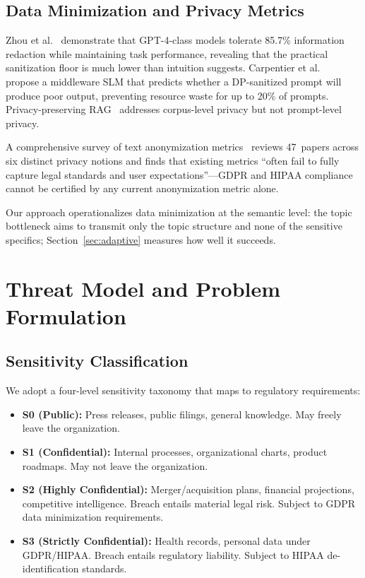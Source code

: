 \documentclass[sigconf,balance=false]{acmart}
\begin{document}
\subsection{Data Minimization and Privacy Metrics}
\label{sec:rw-minimization}

Zhou et al.~\cite{zhou2025} demonstrate that GPT-4-class models tolerate 85.7\% information redaction while maintaining task performance, revealing that the practical sanitization floor is much lower than intuition suggests.
Carpentier et al.~\cite{carpentier2024} propose a middleware SLM that predicts whether a DP-sanitized prompt will produce poor output, preventing resource waste for up to 20\% of prompts.
Privacy-preserving RAG~\cite{zeng2024, syntheticrag2024, dprag2024} addresses corpus-level privacy but not prompt-level privacy.

A comprehensive survey of text anonymization metrics~\cite{metricssurvey2025} reviews 47~papers across six distinct privacy notions and finds that existing metrics ``often fail to fully capture legal standards and user expectations''---GDPR and HIPAA compliance cannot be certified by any current anonymization metric alone.

Our approach operationalizes data minimization at the semantic level: the topic bottleneck aims to transmit only the topic structure and none of the sensitive specifics; Section~\ref{sec:adaptive} measures how well it succeeds.

\section{Threat Model and Problem Formulation}
\label{sec:threat}

\subsection{Sensitivity Classification}
\label{sec:sensitivity}

We adopt a four-level sensitivity taxonomy that maps to regulatory requirements:

\begin{itemize}
\item \textbf{S0 (Public):} Press releases, public filings, general knowledge. May freely leave the organization.
\item \textbf{S1 (Confidential):} Internal processes, organizational charts, product roadmaps. May not leave the organization.
\item \textbf{S2 (Highly Confidential):} Merger/acquisition plans, financial projections, competitive intelligence. Breach entails material legal risk. Subject to GDPR data minimization requirements.
\item \textbf{S3 (Strictly Confidential):} Health records, personal data under GDPR/HIPAA. Breach entails regulatory liability. Subject to HIPAA de-identification standards.
\end{itemize}
\end{document}
